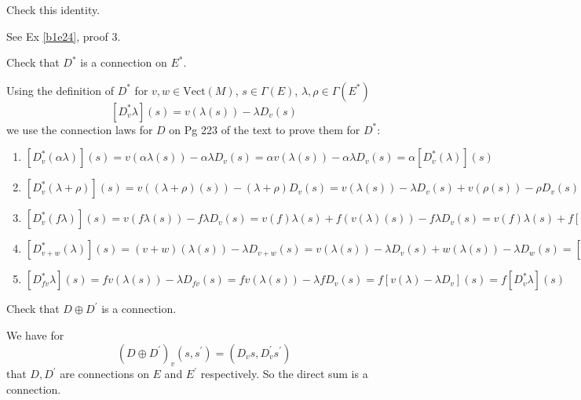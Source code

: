\documentclass[10pt]{article}
\begin{document}
\begin{example}
	Check this identity.
\end{example}
\sol See Ex \ref{b1e24}, proof 3.


\begin{example}\label{b2e103}
	Check that $D^*$ is a connection on $E^*$.
\end{example}
\sol Using the definition of $D^*$ for $v,w \in \text{Vect}(M)$, $s \in \Gamma(E)$, $\lambda,\rho \in \Gamma(E^*)$
$$
[D_v^*\lambda](s)=v(\lambda(s))-\lambda D_v(s)
$$
we use the connection laws for $D$ on Pg 223 of the text to prove them for $D^*$:
\begin{enumerate}
	\item $[D_v^*(\alpha \lambda)](s)=v(\alpha\lambda(s))-\alpha\lambda D_v(s)=\alpha v(\lambda(s))-\alpha\lambda D_v(s)=\alpha[D_v^*(\lambda)](s)$
	\item $[D_v^*(\lambda + \rho)](s) = v((\lambda + \rho)(s))-(\lambda + \rho) D_v(s) = v(\lambda(s))-\lambda D_v(s) + v(\rho(s))-\rho D_v(s) = [D_v^*\lambda](s)+[D_v^*\rho](s)$
	\item $[D_v^*(f\lambda)](s) = v(f\lambda(s))-f\lambda D_v(s) = v(f)\lambda(s)+f(v(\lambda)(s))-f\lambda D_v(s) = v(f)\lambda(s)+f[v(\lambda)-\lambda D_v](s)=v(f)\lambda(s)+f[D_v^*\lambda](s)$
	\item $[D_{v+w}^*(\lambda)](s)=(v+w)(\lambda(s))-\lambda D_{v+w}(s)=v(\lambda(s))-\lambda D_v(s)+w(\lambda(s))-\lambda D_w(s) = [D_v^*\lambda](s)+[D_w^*\lambda](s)$
	\item $[D_{fv}^*\lambda](s) = fv(\lambda(s))-\lambda D_{fv}(s)=fv(\lambda(s))-\lambda fD_v(s) = f[v(\lambda)-\lambda D_v](s)= f[D_v^*\lambda](s)$
\end{enumerate}


\begin{example}
	Check that $D \oplus D^\prime$ is a connection.
\end{example}
\sol We have for
$$
(D \oplus D^\prime)_v(s,s^\prime) = (D_vs,D_v^\prime s^\prime)
$$
that $D,D^\prime$ are connections on $E$ and $E^\prime$ respectively. So the direct sum is a connection.
\end{document}
